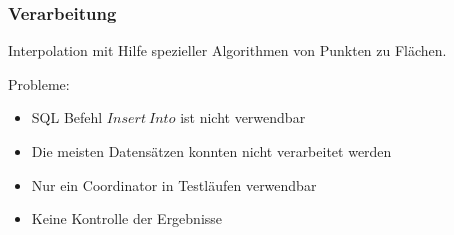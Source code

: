 \documentclass{beamer}
\begin{document}
\begin{frame}\frametitle{Verarbeitung}
Interpolation mit Hilfe spezieller Algorithmen von Punkten zu Flächen.

\begin{block}{Probleme:}
\begin{itemize}
\item SQL Befehl $Insert\ Into$ ist nicht verwendbar
\item Die meisten Datensätzen konnten nicht verarbeitet werden
\item Nur ein Coordinator in Testläufen verwendbar
\item Keine Kontrolle der Ergebnisse
\end{itemize}
\end{block}
\end{frame} 
\end{document}
